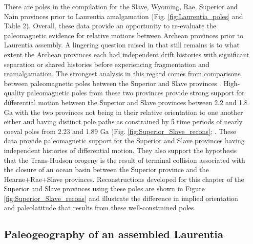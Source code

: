\documentclass[11pt,letterpaper]{article}
\begin{document}
There are poles in the compilation for the Slave, Wyoming, Rae, Superior and Nain provinces prior to Laurentia amalgamation (Fig. \ref{fig:Laurentia_poles} and Table 2). Overall, these data provide an opportunity to re-evaluate the paleomagnetic evidence for relative motions between Archean provinces prior to Laurentia assembly. A lingering question raised in \citet{Hoffman1988a} that still remains is to what extent the Archean provinces each had independent drift histories with significant separation or shared histories before experiencing fragmentation and reamalgamation. The strongest analysis in this regard comes from comparisons between paleomagnetic poles between the Superior and Slave provinces \citep{Buchan2009a, Mitchell2014a, Buchan2016a}. High-quality paleomagnetic poles from these two provinces provide strong support for differential motion between the Superior and Slave provinces between 2.2 and 1.8 Ga with the two provinces not being in their relative orientation to one another either and having distinct pole paths as constrained by 5 time periods of nearly coeval poles from 2.23 and 1.89 Ga (Fig. \ref{fig:Superior_Slave_recons}; \citealp{Buchan2016a}. These data provide paleomagnetic support for the Superior and Slave provinces having independent histories of differential motion. They also support the hypothesis that the Trans-Hudson orogeny is the result of terminal collision associated with the closure of an ocean basin between the Superior province and the Hearne+Rae+Slave provinces. Reconstructions developed for this chapter of the Superior and Slave provinces using these poles are shown in Figure \ref{fig:Superior_Slave_recons} and illustrate the difference in implied orientation and paleolatitude that results from these well-constrained poles.

\subsection{Paleogeography of an assembled Laurentia}
\end{document}
